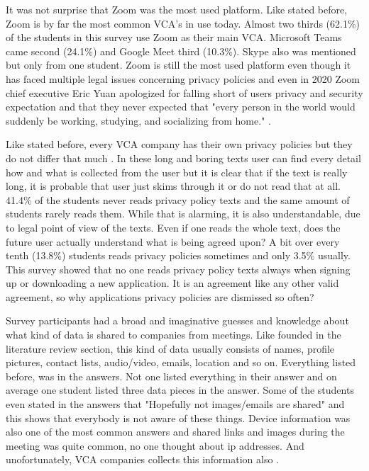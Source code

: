 \documentclass[utf8,english]{gradu3}
\begin{document}
It was not surprise that Zoom was the most used platform. Like stated before, Zoom is by far the most common VCA's in use today. Almost two thirds (62.1\%) of the students in this survey use Zoom as their main VCA. Microsoft Teams came second (24.1\%) and Google Meet third (10.3\%). Skype also was mentioned but only from one student. Zoom is still the most used platform even though it has faced multiple legal issues concerning privacy policies and even in 2020 Zoom chief executive Eric Yuan apologized for falling short of users privacy and security expectation and that they never expected that "every person in the world would suddenly be working, studying, and socializing from home." \parencite{zoomFlaws}.

Like stated before, every VCA company has their own privacy policies but they do not differ that much \parencite{ZoomGoogleMS}. In these long and boring texts user can find every detail how and what is collected from the user but it is clear that if the text is really long, it is probable that user just skims through it or do not read that at all. 41.4\% of the students never reads privacy policy texts and the same amount of students rarely reads them. While that is alarming, it is also understandable, due to legal point of view of the texts. Even if one reads the whole text, does the future user actually understand what is being agreed upon? A bit over every tenth (13.8\%) students reads privacy policies sometimes and only 3.5\% usually. This survey showed that no one reads privacy policy texts always when signing up or downloading a new application. It is an agreement like any other valid agreement, so why applications privacy policies are dismissed so often? 

Survey participants had a broad and imaginative guesses and knowledge about what kind of data is shared to companies from meetings. Like founded in the literature review section, this kind of data usually consists of names, profile pictures, contact lists, audio/video, emails, location and so on. Everything listed before, was in the answers. Not one listed everything in their answer and on average one student listed three data pieces in the answer. Some of the students even stated in the answers that "Hopefully not images/emails are shared" and this shows that everybody is not aware of these things. 
Device information was also one of the most common answers and shared links and images during the meeting was quite common, no one thought about ip addresses. And unofortunately, VCA companies collects this information also \parencite{zoomData}. 
\end{document}
